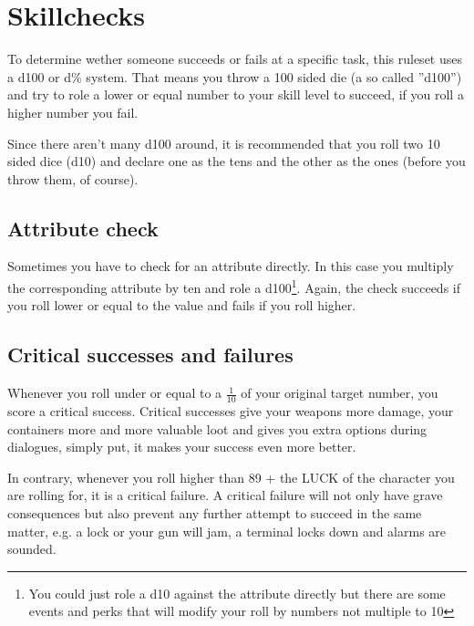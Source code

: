 \section{Skillchecks}
To determine wether someone succeeds or fails at a specific task, this ruleset uses a d100 or d\% system. That means you throw a 100 sided die (a so called ''d100'') and try to role a lower or equal number to your skill level to succeed, if you roll a higher number you fail.

Since there aren't many d100 around, it is recommended that you roll two 10 sided dice (d10) and declare one as the tens and the other as the ones (before you throw them, of course).
\subsection{Attribute check}
Sometimes you have to check for an attribute directly. In this case you multiply the corresponding attribute by ten and role a d100\footnote{You could just role a d10 against the attribute directly but there are some events and perks that will modify your roll by numbers not multiple to 10}. Again, the check succeeds if you roll lower or equal to the value and fails if you roll higher.
\subsection{Critical successes and \mbox{failures}}
Whenever you roll under or equal to a $\frac{1}{10}$ of your original target number, you score a critical success. Critical successes give your weapons more damage, your containers more and more valuable loot and gives you extra options during dialogues, simply put, it makes your success even more better.

In contrary, whenever you roll higher than 89 + the LUCK of the character you are rolling for, it is a critical failure. A critical failure will not only have grave consequences but also prevent any further attempt to succeed in the same matter, e.g. a lock or your gun will jam, a terminal locks down and alarms are sounded.
